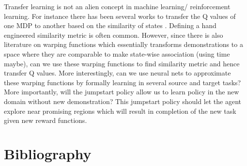 \documentclass{article}[11pt]
\begin{document}
Transfer learning is not an alien concept in machine learning/ reinforcement learning. For instance there has been several works to transfer the Q values of one MDP to another based on the similarity of states \cite{glatt2016towards}. Defining a hand engineered similarity metric is often common. However, since there is also literature on warping functions which essentially transforms demonstrations to a space where they are comparable to make state-wise association (using time maybe), can we use these warping functions to find similarity metric and hence transfer Q values. More interestingly, can we use neural nets to approximate these warping functions by formally learning in several source and target tasks?   
More importantly, will the jumpstart policy allow us to learn policy in the new domain without new demonstration? This jumpstart policy should let the agent explore near promising regions which will result in completion of the new task given new reward functions. 


 




\section{Bibliography}



\end{document}
